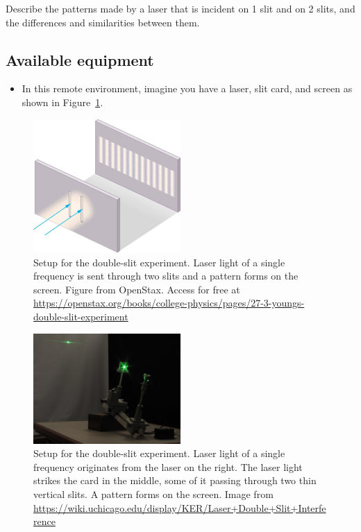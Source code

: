 Describe the patterns made by a laser that is incident on 1 slit and on 2 slits, and the differences and similarities between them.

\subsection{Available equipment}

\begin{itemize}
	\item In this remote environment, imagine you have a laser, slit card, and screen as shown in Figure\ \ref{lir:fig:setup}.
\end{itemize}

\begin{figure}
	\centering
	\includegraphics[width=0.5\textwidth]{laser-interference-remote/double-slit-setup.jpeg}
	\caption{Setup for the double-slit experiment. Laser light of a single frequency is sent through
		two slits and a pattern forms on the screen. Figure from OpenStax. Access for free at \url{https://openstax.org/books/college-physics/pages/27-3-youngs-double-slit-experiment}}\label{lir:fig:setup}
\end{figure}

\begin{figure}
	\centering
	\includegraphics[width=0.5\textwidth]{laser-interference-remote/laser_double_slit_intererfence.JPG}
	\caption{Setup for the double-slit experiment. Laser light of a single frequency originates from the laser on the right. The laser light strikes the card in the middle, some of it passing through two thin vertical slits. A pattern forms on the screen. Image from \url{https://wiki.uchicago.edu/display/KER/Laser+Double+Slit+Interference} }\label{lir:fig:setup-photo}
\end{figure}

